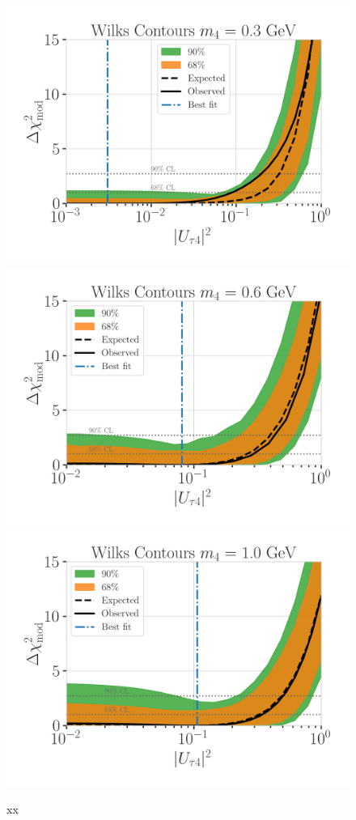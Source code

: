 \begin{figure}[h]
    \includegraphics[width=0.32\linewidth]{figures/results/best_fit/brazil_band_with_asimov_0.3_GeV_updated_with_bfp_with_1sigma.png}
    \includegraphics[width=0.32\linewidth]{figures/results/best_fit/brazil_band_with_asimov_0.6_GeV_updated_with_bfp_with_1sigma.png}
    \includegraphics[width=0.32\linewidth]{figures/results/best_fit/brazil_band_with_asimov_1.0_GeV_updated_with_bfp_with_1sigma.png}
	\caption[xx]{xx}
\end{figure}






